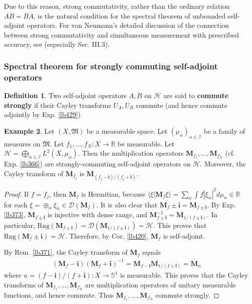 \documentclass[12pt,b5paper,notitlepage]{article}
\theoremstyle{definition}
\newtheorem{df}{Definition}[subsection]
\newtheorem{eg}[df]{Example}
\theoremstyle{plain}
\newcommand{\fk}{\mathfrak}
\newcommand{\Dom}{\mathscr{D}}
\newcommand{\bk}[1]{\langle {#1}\rangle}
\newcommand{\im}{\mathbf{i}}
\newcommand{\Rbb}{\mathbb R}
\newcommand{\Rng}{\mathrm{Rng}}
\newcommand{\Sbb}{{\mathbb S}}
\newcommand{\MH}{\mathcal H}
\newcommand{\SI}{\mathscr I}
\newcommand{\Mbf}{\mathbf M}
\numberwithin{equation}{section}
\begin{document}
Due to this reason, strong commutativity, rather than the ordinary relation $AB=BA$, is the natural condition for the spectral theorem of unbounded self-adjoint operators. For von Neumann's detailed discussion of the connection between strong commutativity and simultaneous measurement with prescribed accuracy, see \cite{vN32a} (especially Sec. III.3).


\subsubsection{Spectral theorem for strongly commuting self-adjoint operators}


\begin{df}
Two self-adjoint operators $A,B$ on $\MH$ are said to \textbf{commute strongly}  if their Cayley transforms $U_A,U_B$ commute (and hence commute adjointly by Exp. \ref{lb429}). 
\end{df}


\begin{eg}\label{lb430}
Let $(X,\fk M)$ be a measurable space. Let $(\mu_\alpha)_{\alpha\in\SI}$ be a family of measures on $\fk M$. Let $f_1,\dots,f_N:X\rightarrow\Rbb$ be measurable. Let $\MH=\bigoplus_{\alpha\in\SI}L^2(X,\mu_\alpha)$. Then the multiplication operators $\Mbf_{f_1},\dots,\Mbf_{f_N}$ (cf. Exp. \ref{lb366}) are strongly-commuting self-adjoint operators on $\MH$. Moreover, the Cayley transform of $\Mbf_{f_j}$ is $\Mbf_{(f_j-\im)/(f_j+\im)}$.
\end{eg}

\begin{proof}
If $f=f_j$, then $\Mbf_f$ is Hermitian, because $\bk{\xi|\Mbf_f\xi}=\sum_\alpha \int f|\xi_\alpha|^2d\mu_\alpha\in\Rbb$ for each $\xi=\oplus_\alpha\xi_\alpha\in\Dom(\Mbf_f)$. It is also clear that $\Mbf_f\pm\im=\Mbf_{f\pm\im}$. By Exp. \ref{lb373}, $\Mbf_{f\pm\im}$ is injective with dense range, and $\Mbf_{f\pm\im}^{-1}=\Mbf_{1/(f\pm\im)}$. In particular, $\Rng(\Mbf_{f\pm\im})=\Dom(\Mbf_{1/(f\pm\im)})=\MH$. This proves that $\Rng(\Mbf_f\pm\im)=\MH$. Therefore, by Cor. \ref{lb420}, $\Mbf_f$ is self-adjoint.

By Rem. \ref{lb371}, the Cayley transform of $\Mbf_f$ equals
\begin{align*}
(\Mbf_f-\im)(\Mbf_f+\im)^{-1}=\Mbf_{f-\im}\Mbf_{1/(f+\im)}=\Mbf_u
\end{align*}
where $u=(f-\im)/(f+\im):X\rightarrow\Sbb^1$ is measurable. This proves that the Cayley transforms of $\Mbf_{f_1},\dots,\Mbf_{f_N}$ are multiplication operators of unitary measurable functions, and hence commute. Thus $\Mbf_{f_1},\dots,\Mbf_{f_N}$ commute strongly.
\end{proof}
\end{document}
